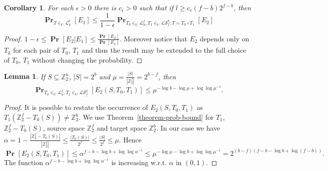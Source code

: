 \documentclass{article}
\newcommand{\vecspace}[2]{\mathbb{Z}_{#1}^{#2}}
\newcommand{\binvecspace}[1]{\vecspace{2}{#1}}
\newcommand{\linearmaps}[2]{\mathcal{L}_{#1}^{#2}}
\newcommand{\surjectivelinearmaps}[2]{\mathcal{LS}_{#1}^{#2}}
\newcommand{\probs}[2]{\operatorname{\mathbf{Pr}}_{{#1}}\left[{#2}\right]}
\newcommand{\prob}[1]{\probs{}{#1}}
\newtheorem{lemma}{Lemma}
\newtheorem{corollary}{Corollary}
\begin{document}
\begin{corollary}
\label{corollary-e1-e2}
For each $\epsilon > 0$ there is $c_\epsilon > 0$ such that if $l \geq c_\epsilon (f - b)2^{f-b}$, then
\[
\probs{T \in_U \linearmaps{u}{b}}{E_1} \leq \frac{1}{1 - \epsilon}\probs{T_0 \in_U \linearmaps{u}{f}, T_1 \in_U \surjectivelinearmaps{f}{b}\colon T = T_0 \circ T_1}{E_2}
\]
\end{corollary}
\begin{proof}
$1- \epsilon \leq \prob{E_2 | E_1} \leq \frac{\prob{E_2}}{\prob{E_1}}$.
Moreover notice that $E_2$ depends only on $T_k$ for each pair of $T_0$, $T_1$ and thus the result may be extended to the full choice of $T_0$, $T_1$ without changing the probability. 
\end{proof}

\begin{lemma}
\label{lemma-bound}
If $S \subseteq \binvecspace{u}$, $|S| = 2^b$ and $\mu = \frac{|S|}{|\binvecspace{f}|} = 2^{b - f}$, then
\[
\probs{T_0 \in_U \linearmaps{u}{f}, T_1 \in_U \surjectivelinearmaps{f}{b}}{E_2(S, T_0, T_1)} \leq \mu ^ {-\log b - \log \mu + \log \log \mu^{-1}}.
\]
\end{lemma}
\begin{proof}
It is possible to restate the occurrence of $E_2(S, T_0, T_1)$ as $T_1(\binvecspace{f} - T_0(S)) \neq \binvecspace{b}$.
We use Theorem~\ref{theorem-prob-bound} for $T_1$, $\binvecspace{f} - T_0(S)$, source space $\binvecspace{f}$ and target space $\binvecspace{b}$.
In our case we have $\alpha = 1 - \frac{|\binvecspace{f} - T_0(S)|}{|\binvecspace{f}|} \leq \frac{|T_0(S)|}{2^f} \leq \frac{|S|}{2^f} \leq \mu$.
Hence
$
\prob{E_2(S, T_0, T_1)} \leq \alpha ^ {f - b - \log b + \log \log \alpha^{-1}} \leq \mu ^ {-\log \mu - \log b + \log \log \mu^{-1}} = 2^{(b - f)(f - b - \log b + \log (f - b))}.
$
The function $\alpha ^ {f - b - \log b + \log \log \alpha^{-1}}$ is increasing w.r.t. $\alpha$ in $(0, 1)$.
\end{proof} 
\end{document}
